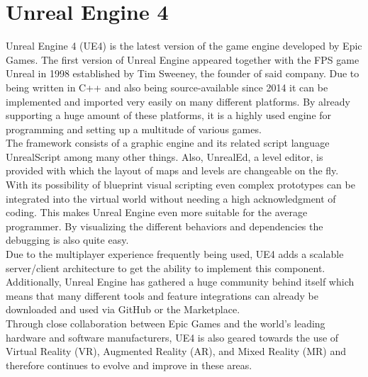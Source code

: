 \documentclass{report}
\begin{document}
	\section[Unreal Engine 4]{Unreal Engine 4 \textsc{\small{\cite{UE4}}}}
	\startsection
		Unreal Engine 4 (UE4) is the latest version of the game engine developed by Epic Games. The first version of Unreal Engine appeared together with the FPS game Unreal in 1998 established by Tim Sweeney, the founder of said company. Due to being written in C++ and also being source-available since 2014 it can be implemented and imported very easily on many different platforms. By already supporting a huge amount of these platforms, it is a highly used engine for programming and setting up a multitude of various games. \\
		The framework consists of a graphic engine and its related script language UnrealScript among many other things. Also, UnrealEd, a level editor, is provided with which the layout of maps and levels are changeable on the fly. With its possibility of blueprint visual scripting even complex prototypes can be integrated into the virtual world without needing a high acknowledgment of coding. This makes Unreal Engine even more suitable for the average programmer. By visualizing the different behaviors and dependencies the debugging is also quite easy. \\
		Due to the multiplayer experience frequently being used, UE4 adds a scalable server/client architecture to get the ability to implement this component. Additionally, Unreal Engine has gathered a huge community behind itself which means that many different tools and feature integrations can already be downloaded and used via GitHub or the Marketplace. \\
		Through close collaboration between Epic Games and the world's leading hardware and software manufacturers, UE4 is also geared towards the use of Virtual Reality (VR), Augmented Reality (AR), and Mixed Reality (MR) and therefore continues to evolve and improve in these areas.
	\closesection
\end{document}
